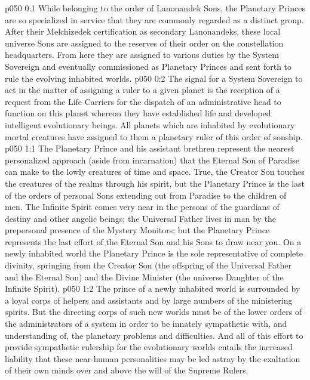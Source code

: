 \author{Secondary Lanonandek}
\vs p050 0:1 While belonging to the order of Lanonandek Sons, the Planetary Princes are so specialized in service that they are commonly regarded as a distinct group. After their Melchizedek certification as secondary Lanonandeks, these local universe Sons are assigned to the reserves of their order on the constellation headquarters. From here they are assigned to various duties by the System Sovereign and eventually commissioned as Planetary Princes and sent forth to rule the evolving inhabited worlds.
\vs p050 0:2 The signal for a System Sovereign to act in the matter of assigning a ruler to a given planet is the reception of a request from the Life Carriers for the dispatch of an administrative head to function on this planet whereon they have established life and developed intelligent evolutionary beings. All planets which are inhabited by evolutionary mortal creatures have assigned to them a planetary ruler of this order of sonship.
\vs p050 1:1 The Planetary Prince and his assistant brethren represent the nearest personalized approach (aside from incarnation) that the Eternal Son of Paradise can make to the lowly creatures of time and space. True, the Creator Son touches the creatures of the realms through his spirit, but the Planetary Prince is the last of the orders of personal Sons extending out from Paradise to the children of men. The Infinite Spirit comes very near in the persons of the guardians of destiny and other angelic beings; the Universal Father lives in man by the prepersonal presence of the Mystery Monitors; but the Planetary Prince represents the last effort of the Eternal Son and his Sons to draw near you. On a newly inhabited world the Planetary Prince is the sole representative of complete divinity, springing from the Creator Son (the offspring of the Universal Father and the Eternal Son) and the Divine Minister (the universe Daughter of the Infinite Spirit).
\vs p050 1:2 The prince of a newly inhabited world is surrounded by a loyal corps of helpers and assistants and by large numbers of the ministering spirits. But the directing corps of such new worlds must be of the lower orders of the administrators of a system in order to be innately sympathetic with, and understanding of, the planetary problems and difficulties. And all of this effort to provide sympathetic rulership for the evolutionary worlds entails the increased liability that these near\hyp{}human personalities may be led astray by the exaltation of their own minds over and above the will of the Supreme Rulers.
